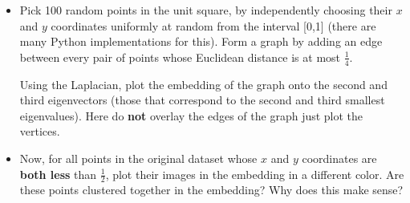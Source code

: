 \documentclass{article}
\begin{document}
\begin{itemize}
    \item Pick 100 random points in the unit square, by independently choosing their $x$ and $y$ coordinates uniformly at random from the interval [0,1] (there are many Python implementations for this). Form a graph by adding an edge between every pair of points whose Euclidean distance is at most $\frac{1}{4}$. 

Using the Laplacian, plot the embedding of the graph onto the second and third eigenvectors (those that correspond to the second and third smallest eigenvalues). Here do \textbf{not} overlay the edges of the graph just plot the vertices.

\item Now, for all points in the original dataset whose $x$ and $y$ coordinates are \textbf{both less} than $\frac 12$, plot their images in the embedding in a different color. Are these points clustered together in the embedding? Why does this make sense?\\
\end{itemize}
\end{document}
